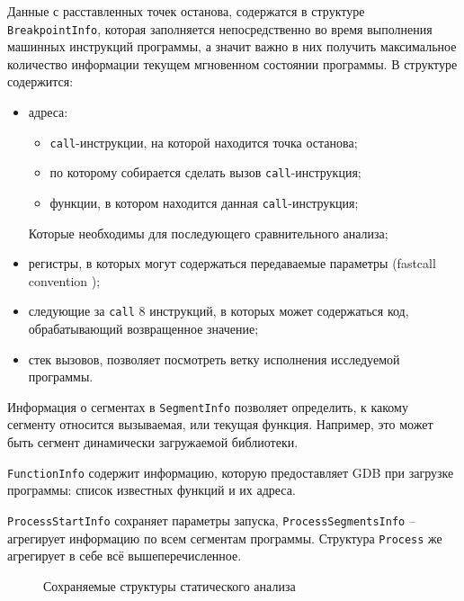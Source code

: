 Данные с расставленных точек останова, содержатся в структуре \texttt{BreakpointInfo}, 
которая заполняется непосредственно во время выполнения машинных инструкций программы, а значит важно
в них получить максимальное количество информации текущем мгновенном состоянии программы.
В структуре содержится:
\begin{itemize}
    \item адреса:
            \begin{itemize}
                \item \texttt{call}-инструкции, на которой находится точка останова;
                \item по которому собирается сделать вызов \texttt{call}-инструкция;
                \item функции, в котором находится данная \texttt{call}-инструкция;
            \end{itemize}
            Которые необходимы для последующего сравнительного анализа;
        \item регистры, в которых могут содержаться передаваемые параметры (fastcall convention \autocite{fastcall});
        \item следующие за \texttt{call} 8 инструкций, в которых может содержаться код, обрабатывающий
            возвращенное значение;
        \item стек вызовов, позволяет посмотреть ветку исполнения исследуемой программы.
\end{itemize}

Информация о сегментах в \texttt{SegmentInfo} позволяет определить, к какому сегменту относится
вызываемая, или текущая функция. Например, это может быть сегмент динамически загружаемой библиотеки.

\texttt{FunctionInfo} содержит информацию, которую предоставляет GDB при загрузке программы:
список известных функций и их адреса. 

\texttt{ProcessStartInfo} сохраняет параметры запуска, \texttt{ProcessSegmentsInfo} -- 
агрегирует информацию по всем сегментам программы.
Структура \texttt{Process} же агрегирует в себе всё вышеперечисленное.

\begin{figure}[!htbp]
    \centerfloat{
        
    }
    \caption{Сохраняемые структуры статического анализа \label{fig:static-json}}
\end{figure}

